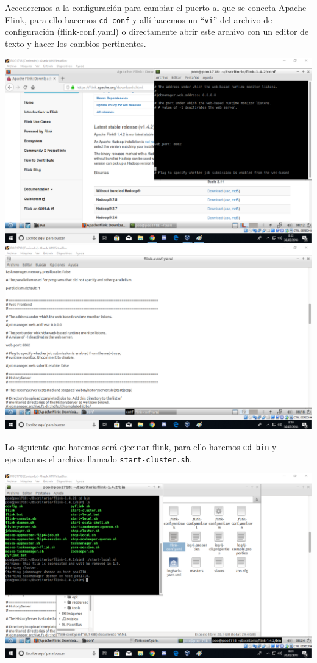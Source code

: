 \documentclass[12pt,letterpaper]{article}
\begin{document}
Accederemos a la configuración para cambiar el puerto al que se  conecta Apache Flink, para ello hacemos \texttt{cd conf} y allí hacemos un ``\texttt{vi}'' del archivo de configuración (flink-conf.yaml) o directamente abrir este archivo con un editor de texto y hacer los cambios pertinentes.
\begin{center}
	\includegraphics[scale=0.5]{6.png}\\
	
	\includegraphics[scale=0.5]{7.png}
\end{center}
Lo siguiente que haremos será ejecutar flink, para ello haremos \texttt{cd bin} y ejecutamos el archivo llamado \texttt{start-cluster.sh}.
\begin{center}
	\includegraphics[scale=0.5]{8.png}
\end{center}
\end{document}
